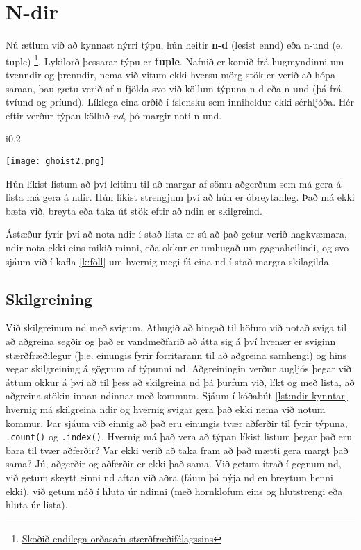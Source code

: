 
\chapter{N-dir}\label{k:ndir}
Nú ætlum við að kynnast nýrri týpu, hún heitir \textbf{n-d} (lesist ennd) eða n-und (e. tuple) \footnote{\href{http://stæ.is/os}{Skoðið endilega orðasafn stærðfræðifélagssins}}.
Lykilorð þessarar týpu er \textbf{tuple}.
Nafnið er komið frá hugmyndinni um tvenndir og þrenndir, nema við vitum ekki hversu mörg stök er verið að hópa saman, þau gætu verið af n fjölda svo við köllum týpuna n-d eða n-und (þá frá tvíund og þríund).
Líklega eina orðið í íslensku sem inniheldur ekki sérhljóða.
Hér eftir verður týpan kölluð \emph{nd}, þó margir noti n-und.
 \begin{wrapfigure}{i}{0.2\textwidth} %
 	\begin{center}
 		\texttt{[image: ghoist2.png]}
 	\end{center}
 \end{wrapfigure}
Hún líkist listum að því leitinu til að margar af sömu aðgerðum sem má gera á lista má gera á ndir.
Hún líkist strengjum því að hún er óbreytanleg.
Það má ekki bæta við, breyta eða taka út stök eftir að ndin er skilgreind.

Ástæður fyrir því að nota ndir í stað lista er sú að það getur verið hagkvæmara, ndir nota ekki eins mikið minni, eða okkur er umhugað um gagnaheilindi, og svo sjáum við í kafla \ref{k:föll} um hvernig megi fá eina nd í stað margra skilagilda.

\section{Skilgreining}
Við skilgreinum nd með svigum.
Athugið að hingað til höfum við notað sviga til að aðgreina segðir og það er vandmeðfarið að átta sig á því hvenær er sviginn stærðfræðilegur (þ.e. einungis fyrir forritarann til að aðgreina samhengi) og hins vegar skilgreining á gögnum af týpunni nd.
Aðgreiningin verður augljós þegar við áttum okkur á því að til þess að skilgreina nd þá þurfum við, líkt og með lista, að aðgreina stökin innan ndinnar með kommum.
Sjáum í kóðabút \ref{lst:ndir-kynntar} hvernig má skilgreina ndir og hvernig svigar gera það ekki nema við notum kommur.
Þar sjáum við einnig að það eru einungis tvær aðferðir til fyrir týpuna, \texttt{.count()} og \texttt{.index()}.
Hvernig má það vera að týpan líkist listum þegar það eru bara til tvær aðferðir?
Var ekki verið að taka fram að það mætti gera margt það sama?
Jú, aðgerðir og aðferðir er ekki það sama.
Við getum ítrað í gegnum nd, við getum skeytt einni nd aftan við aðra (fáum þá nýja nd en breytum henni ekki), við getum náð í hluta úr ndinni (með hornklofum eins og hlutstrengi eða hluta úr lista).

